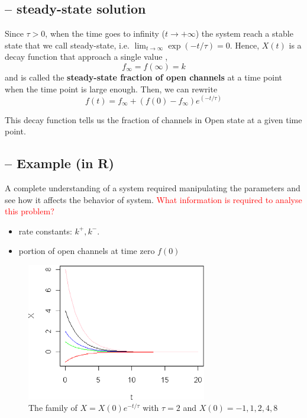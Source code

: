 \subsection{-- steady-state solution}
\label{sec:steady-state-value-example}

Since $\tau > 0$, when the time goes to infinity ($t \rightarrow
+\infty$) the system reach a stable state that we call steady-state,
i.e.  $\lim_{t\rightarrow \infty} \exp({- t/\tau}) = 0$. Hence, $X(t)$
is a decay function that approach a single value ,
\begin{equation}
  \label{eq:23}
  f_{\infty} =f(\infty) = k  
\end{equation}
and is called the {\bf steady-state fraction of open channels} at a
time point when the time point is large enough.  Then, we can rewrite
\begin{equation}
  \label{eq:15}
  f(t) = f_\infty + (f(0) - f_\infty) e^{({-t/\tau})}
\end{equation}

This decay function tells us the fraction of channels in Open state at a
given time point.



\subsection{-- Example (in R)}
\label{sec:example-in-r}

A complete understanding of a system required manipulating the
parameters and see how it affects the behavior of system.
\textcolor{red}{What information is required to analyse this problem?}
\begin{itemize}
\item rate constants: $k^+, k^-$.

\item portion of open channels at time zero $f(0)$
\end{itemize}



\begin{figure}[htb]
  \centerline{\includegraphics[height=6cm]{./images/gating_analytical.eps}}
  \caption{The family of $X=X(0)e^{-t/\tau}$ with $\tau=2$ and $X(0) =
    -1,1,2,4,8$}\label{fig:gating-analytical}
\end{figure}

